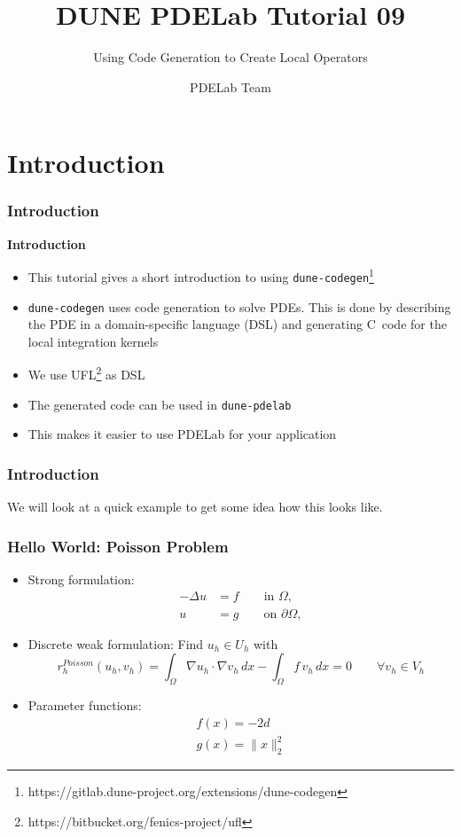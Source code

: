 \documentclass[aspectratio=169,11pt]{beamer}
\title{DUNE PDELab Tutorial 09}
\subtitle{Using Code Generation to Create Local Operators}
\author{PDELab Team}
\institute[]
{
  IWR\\
  Heidelberg University
}
\theoremstyle{definition}
\def\CC{{C\nolinebreak[4]\hspace{-.05em}\raisebox{.4ex}{\tiny\bf ++}}}
\begin{document}

\section{Introduction}

\begin{frame}[fragile]
  \frametitle{Introduction}
  \textbf{Introduction}
  \begin{itemize}
  \item This tutorial gives a short introduction to using
    \lstinline{dune-codegen}\footnote{https://gitlab.dune-project.org/extensions/dune-codegen}
  \item \lstinline{dune-codegen} uses code generation to solve PDEs. This is
    done by describing the PDE in a domain-specific language (DSL) and
    generating \CC\ code for the local integration kernels
  \item We use UFL\footnote{https://bitbucket.org/fenics-project/ufl} as DSL
  \item The generated code can be used in \lstinline{dune-pdelab}
  \item This makes it easier to use PDELab for your application
  \end{itemize}
\end{frame}

\begin{frame}
  \frametitle{Introduction}
  We will look at a quick example to get some idea how this looks like.
\end{frame}

\begin{frame}
  \frametitle{Hello World: Poisson Problem}

  \begin{itemize}
  \item Strong formulation:
    \begin{align*}
      -\Delta u & = f \qquad\text{in $\Omega$}, \\
      u &= g \qquad\text{on $\partial\Omega$},
    \end{align*}
  \item Discrete weak formulation: Find $u_h \in U_h$ with
    \begin{equation*}
      r_h^{Poisson}(u_h, v_h) = \int_\Omega \nabla u_h \cdot \nabla v_h \, dx
      - \int_\Omega f \, v_h \, dx = 0 \qquad \forall v_h \in V_h
    \end{equation*}
  \item Parameter functions:
    \begin{align*}
      f(x) = -2d \\
      g(x) = \| x \|_2^2
    \end{align*}
  \end{itemize}
\end{frame}
\end{document}
